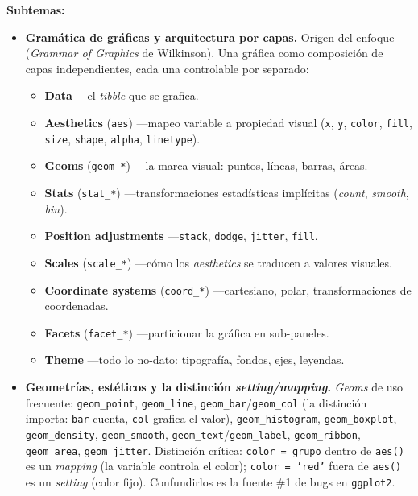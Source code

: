 \documentclass[11pt,letterpaper]{article}
\newcommand{\blue}[1]{{\color{cerulean}#1}}
\begin{document}
\textbf{Subtemas:}

\begin{itemize}[leftmargin=*, itemsep=2pt]
    \item \textbf{Gramática de gráficas y arquitectura por capas.} Origen del enfoque (\textit{Grammar of Graphics} de Wilkinson). Una gráfica como composición de \blue{capas independientes}, cada una controlable por separado:
    \begin{itemize}[leftmargin=*, itemsep=1pt, label=$\circ$]
        \item \textbf{Data} ---el \textit{tibble} que se grafica.
        \item \textbf{Aesthetics} (\texttt{aes}) ---mapeo variable a propiedad visual (\texttt{x}, \texttt{y}, \texttt{color}, \texttt{fill}, \texttt{size}, \texttt{shape}, \texttt{alpha}, \texttt{linetype}).
        \item \textbf{Geoms} (\texttt{geom\_*}) ---la marca visual: puntos, líneas, barras, áreas.
        \item \textbf{Stats} (\texttt{stat\_*}) ---transformaciones estadísticas implícitas (\textit{count}, \textit{smooth}, \textit{bin}).
        \item \textbf{Position adjustments} ---\texttt{stack}, \texttt{dodge}, \texttt{jitter}, \texttt{fill}.
        \item \textbf{Scales} (\texttt{scale\_*}) ---cómo los \textit{aesthetics} se traducen a valores visuales.
        \item \textbf{Coordinate systems} (\texttt{coord\_*}) ---cartesiano, polar, transformaciones de coordenadas.
        \item \textbf{Facets} (\texttt{facet\_*}) ---particionar la gráfica en sub-paneles.
        \item \textbf{Theme} ---todo lo no-dato: tipografía, fondos, ejes, leyendas.
    \end{itemize}
    \item \textbf{Geometrías, estéticos y la distinción \textit{setting/mapping}.} \textit{Geoms} de uso frecuente: \texttt{geom\_point}, \texttt{geom\_line}, \texttt{geom\_bar}/\texttt{geom\_col} (la distinción importa: \texttt{bar} cuenta, \texttt{col} grafica el valor), \texttt{geom\_histogram}, \texttt{geom\_boxplot}, \texttt{geom\_density}, \texttt{geom\_smooth}, \texttt{geom\_text}/\texttt{geom\_label}, \texttt{geom\_ribbon}, \texttt{geom\_area}, \texttt{geom\_jitter}. \blue{Distinción crítica}: \texttt{color = grupo} dentro de \texttt{aes()} es un \textit{mapping} (la variable controla el color); \texttt{color = 'red'} fuera de \texttt{aes()} es un \textit{setting} (color fijo). Confundirlos es la fuente \#1 de bugs en \texttt{ggplot2}.

\end{itemize}
\end{document}
